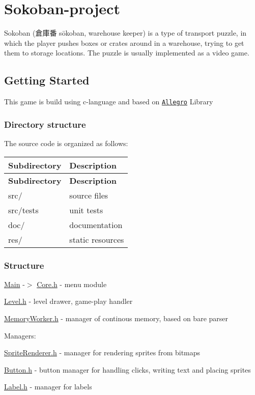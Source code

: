 \section*{Sokoban-\/project}

Sokoban (倉庫番 sōkoban, warehouse keeper) is a type of transport puzzle, in which the player pushes boxes or crates around in a warehouse, trying to get them to storage locations. The puzzle is usually implemented as a video game.

\subsection*{Getting Started}

This game is build using c-\/language and based on \href{http://liballeg.org/}{\tt Allegro} Library \subsubsection*{Directory structure}

The source code is organized as follows\+:

\tabulinesep=1mm
\begin{longtabu} spread 0pt [c]{*{2}{|X[-1]}|}
\hline
\rowcolor{\tableheadbgcolor}\textbf{ Subdirectory }&\textbf{ Description  }\\
\endfirsthead
\hline
\endfoot
\hline
\rowcolor{\tableheadbgcolor}\textbf{ Subdirectory }&\textbf{ Description  }\\
\endhead
src/ &source files \\
src/tests &unit tests \\
doc/ &documentation \\
res/     &static resources \\
\end{longtabu}
\subsubsection*{Structure}


\begin{DoxyItemize}
\item \hyperlink{group___main}{Main} -\/$>$ \hyperlink{_core_8h}{Core.\+h} -\/ menu module
\item \hyperlink{_level_8h}{Level.\+h} -\/ level drawer, game-\/play handler
\item \hyperlink{_memory_worker_8h}{Memory\+Worker.\+h} -\/ manager of continous memory, based on bare parser
\item Managers\+:
\begin{DoxyItemize}
\item \hyperlink{_sprite_renderer_8h}{Sprite\+Renderer.\+h} -\/ manager for rendering sprites from bitmaps
\item \hyperlink{_button_8h}{Button.\+h} -\/ button manager for handling clicks, writing text and placing sprites
\item \hyperlink{_label_8h}{Label.\+h} -\/ manager for labels
\end{DoxyItemize}
\end{DoxyItemize}

